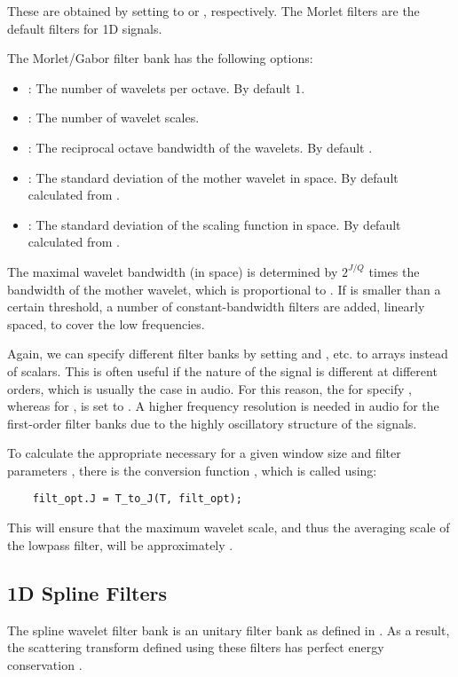 \documentclass[twocolumn]{article}
\begin{document}
These are obtained by setting  to  or , respectively. The Morlet filters are the default filters for 1D signals. 

The Morlet/Gabor filter bank has the following options:
\begin{itemize}
	\item {}: The number of wavelets per octave. By default $1$.
	\item {}: The number of wavelet scales.
	\item {}: The reciprocal octave bandwidth of the wavelets. By default .
	\item {}: The standard deviation of the mother wavelet in space. By default calculated from .
	\item {}: The standard deviation of the scaling function in space. By default calculated from .
\end{itemize}
The maximal wavelet bandwidth (in space) is determined by $2^{J/Q}$ times the bandwidth of the mother wavelet, which is proportional to . If  is smaller than a certain threshold, a number of constant-bandwidth filters are added, linearly spaced, to cover the low frequencies.

Again, we can specify different filter banks by setting  and , etc. to arrays instead of scalars. This is often useful if the nature of the signal is different at different orders, which is usually the case in audio. For this reason, the  for  specify , whereas for ,  is set to . A higher frequency resolution is needed in audio for the first-order filter banks due to the highly oscillatory structure of the signals.

To calculate the appropriate  necessary for a given window size  and filter parameters , there is the conversion function , which is called using:
\begin{lstlisting}
	filt_opt.J = T_to_J(T, filt_opt);
\end{lstlisting}
This will ensure that the maximum wavelet scale, and thus the averaging scale of the lowpass filter, will be approximately .

\subsection{1D Spline Filters}
The spline wavelet filter bank is an unitary filter bank as defined in \cite{mallatbook}. As a result, the scattering transform defined using these filters has perfect energy conservation \cite{stephane}.
\end{document}
